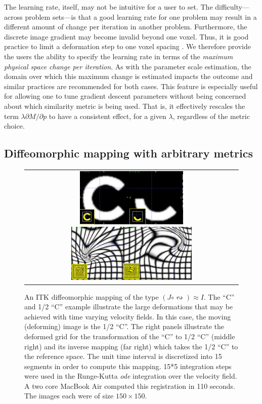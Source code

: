 \documentclass{llncs}
\begin{document}
The learning rate, itself, may not be intuitive for a user to set.
The difficulty---across problem sets---is that a good learning rate for
one problem may result in a different amount of change per iteration
in another problem.  Furthermore, the discrete image gradient may
become invalid beyond one voxel.  Thus, it is good practice to limit a deformation step to one voxel spacing
\cite{Jenkinson2001}.  We therefore provide the users the ability to
specify the learning rate in terms of the {\em maximum physical space change
  per iteration}.  As with the parameter scale estimation, the domain
over which this maximum change is estimated impacts the outcome and
similar practices are recommended for both cases.   This feature is
especially useful for allowing one to tune gradient descent parameters
without being concerned about which similarity metric is being used.
That is, it effectively rescales the term $\lambda \partial M / \partial p$ to
have a consistent effect, for a given $\lambda$, regardless of the metric choice.

\subsection{Diffeomorphic mapping with arbitrary metrics}
\begin{figure}[t]
\begin{center}
\begin{tabular}{c}
\includegraphics[height=1.1in]{figs/c_chalf.pdf}
\includegraphics[height=1.1in]{figs/c_half_c_grids.pdf}
\end{tabular}
\caption{\baselineskip 12pt \small An ITK diffeomorphic mapping of the
  type $(J \circ \leftrightsquigarrow) \approx I$.  The 
``C'' and 1/2 ``C'' example illustrate the large deformations that may
be achieved with time varying velocity fields.  In this case, the moving (deforming) image is
the 1/2 ``C''.  The right panels illustrate the deformed grid for the
transformation of the ``C'' to 1/2 ``C'' (middle right) and its
inverse mapping (far right) which takes the 1/2 ``C'' to the reference
space.  The unit time interval is discretized into 15 segments in
order to compute this mapping.  15*5 integration steps were used in
the Runge-Kutta {\em ode} integration over the velocity field.  A two
core MacBook Air computed this registration in 110 seconds.  The images
each were of size $150 \times 150$.}
\label{fig:chalf}
\end{center}
\end{figure}
\end{document}
